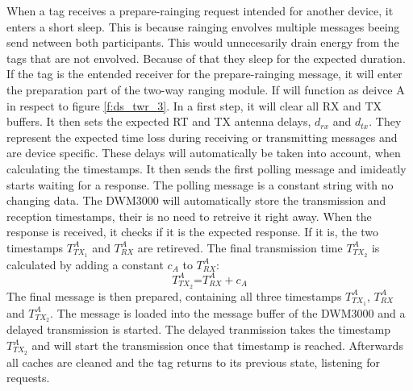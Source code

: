 When a tag receives a prepare-rainging request intended for another device, it enters a short sleep.
This is because rainging envolves multiple messages beeing send netween both participants.
This would unnecesarily drain energy from the tags that are not envolved.
Because of that they sleep for the expected duration. \\
If the tag is the entended receiver for the prepare-rainging message, it will enter the preparation part of the two-way ranging module.
If will function as deivce A in respect to figure \ref{f:ds_twr_3}.
In a first step, it will clear all RX and TX buffers.
It then sets the expected RT and TX antenna delays, $d_{rx}$ and $d_{tx}$.
They represent the expected time loss during receiving or transmitting messages and are device specific.
These delays will automatically be taken into account, when calculating the timestamps.
It then sends the first polling message and imideatly starts waiting for a response.
The polling message is a constant string with no changing data.
The DWM3000 will automatically store the transmission and reception timestamps, their is no need to retreive it right away.
When the response is received, it checks if it is the expected response.
If it is, the two timestamps $T_{TX_1}^A$ and $T_{RX}^A$ are retireved.
The final transmission time $T_{TX_2}^A$ is calculated by adding a constant $c_A$ to $T_{RX}^A$:\begin{equation}
	\mbox{$T_{TX_2}^A$=}
	\mbox{$T_{RX}^A+c_A$}
\end{equation}
The final message is then prepared, containing all three timestamps $T_{TX_1}^A$, $T_{RX}^A$ and $T_{TX_2}^A$.
The message is loaded into the message buffer of the DWM3000 and a delayed transmission is started.
The delayed tranmission takes the timestamp $T_{TX_2}^A$ and will start the transmission once that timestamp is reached.
Afterwards all caches are cleaned and the tag returns to its previous state, listening for requests.


